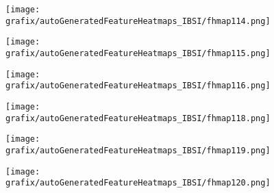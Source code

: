 \hspace{\hsp} 
\begin{subfigure}{\wid\textwidth} 
    \centering 
    \caption{\tiny \sffamily {}} 
    \vspace{\vsp} 
    \texttt{[image: grafix/autoGeneratedFeatureHeatmaps\_IBSI/fhmap114.png]} 
\end{subfigure} 
\hspace{\hsp} 
\begin{subfigure}{\wid\textwidth} 
    \centering 
    \caption{\tiny \sffamily {}} 
    \vspace{\vsp} 
    \texttt{[image: grafix/autoGeneratedFeatureHeatmaps\_IBSI/fhmap115.png]} 
\end{subfigure} 
\hspace{\hsp} 
\begin{subfigure}{\wid\textwidth} 
    \centering 
    \caption{\tiny \sffamily {}} 
    \vspace{\vsp} 
    \texttt{[image: grafix/autoGeneratedFeatureHeatmaps\_IBSI/fhmap116.png]} 
\end{subfigure} 
\hspace{\hsp} 
\begin{subfigure}{\wid\textwidth} 
    \centering 
    \caption{\small \sffamily {}} 
\end{subfigure} 
\hspace{\hsp} 
\begin{subfigure}{\wid\textwidth} 
    \centering 
    \caption{\tiny \sffamily {}} 
    \vspace{\vsp} 
    \texttt{[image: grafix/autoGeneratedFeatureHeatmaps\_IBSI/fhmap118.png]} 
\end{subfigure} 
\hspace{\hsp} 
\begin{subfigure}{\wid\textwidth} 
    \centering 
    \caption{\tiny \sffamily {}} 
    \vspace{\vsp} 
    \texttt{[image: grafix/autoGeneratedFeatureHeatmaps\_IBSI/fhmap119.png]} 
\end{subfigure} 
\hspace{\hsp} 
\begin{subfigure}{\wid\textwidth} 
    \centering 
    \caption{\tiny \sffamily {}} 
    \vspace{\vsp} 
    \texttt{[image: grafix/autoGeneratedFeatureHeatmaps\_IBSI/fhmap120.png]} 
\end{subfigure} 
